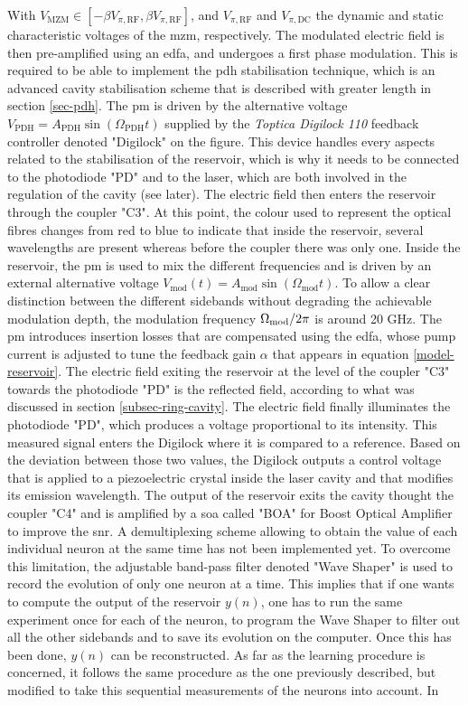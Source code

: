 With $V_{\text{MZM}} \in [-\beta V_{\pi,\text{RF}},\beta V_{\pi,\text{RF}}]$, and $V_{\pi,\text{RF}}$ and $V_{\pi,\text{DC}}$ the dynamic and static characteristic voltages of the \gls{mzm}, respectively. The modulated electric field is then pre-amplified using an \gls{edfa}, and undergoes a first phase modulation. This is required to be able to implement the \gls{pdh} stabilisation technique, which is an advanced cavity stabilisation scheme that is described with greater length in section \ref{sec-pdh}. The \gls{pm} is driven by the alternative voltage $V_{\text{PDH}} = A_{\text{PDH}} \sin{(\Omega_{\text{PDH}}t)}$ supplied by the \textit{Toptica Digilock 110} feedback controller denoted "Digilock" on the figure. This device handles every aspects related to the stabilisation of the reservoir, which is why it needs to be connected to the photodiode "PD" and to the laser, which are both involved in the regulation of the cavity (see later). The electric field then enters the reservoir through the coupler "C3". At this point, the colour used to represent the optical fibres changes from red to blue to indicate that inside the reservoir, several wavelengths are present whereas before the coupler there was only one. Inside the reservoir, the \gls{pm} is used to mix the different frequencies and is driven by an external alternative voltage $V_{\text{mod}}(t) = A_{\text{mod}} \sin{ (\Omega_{\text{mod}} t)}$. To allow a clear distinction between the different sidebands without degrading the achievable modulation depth, the modulation frequency $\Omega_{\text{mod}}/2\pi$ is around 20 GHz. The \gls{pm} introduces insertion losses that are compensated using the \gls{edfa}, whose pump current is adjusted to tune the feedback gain $\alpha$ that appears in equation \eqref{model-reservoir}. The electric field exiting the reservoir at the level of the coupler "C3" towards the photodiode "PD" is the reflected field, according to what was discussed in section \ref{subsec-ring-cavity}. The electric field finally illuminates the photodiode "PD", which produces a voltage proportional to its intensity. This measured signal enters the Digilock where it is compared to a reference. Based on the deviation between those two values, the Digilock outputs a control voltage that is applied to a piezoelectric crystal inside the laser cavity and that modifies its emission wavelength. The output of the reservoir exits the cavity thought the coupler "C4" and is amplified by a \gls{soa} called "BOA" for Boost Optical Amplifier to improve the \gls{snr}. A demultiplexing scheme allowing to obtain the value of each individual neuron at the same time has not been implemented yet. To overcome this limitation, the adjustable band-pass filter denoted "Wave Shaper" is used to record the evolution of only one neuron at a time. This implies that if one wants to compute the output of the reservoir $y(n)$, one has to run the same experiment once for each of the neuron, to program the Wave Shaper to filter out all the other sidebands and to save its evolution on the computer. Once this has been done, $y(n)$ can be reconstructed. As far as the learning procedure is concerned, it follows the same procedure as the one previously described, but modified to take this sequential measurements of the neurons into account. In 